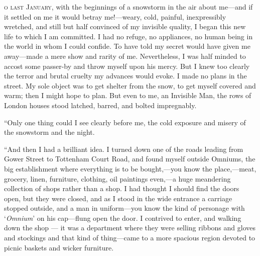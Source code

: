 \label{ch:22}
\begin{ChapterStart}
\vspace*{2\nbs}

\vspace{1.5\nbs}
\end{ChapterStart}

\kern-5pt\textsc{o last January,} with the beginnings of a snowstorm in the air about me—and if it settled on me it would betray me!—weary, cold, painful, inexpressibly wretched, and still but half convinced of my invisible quality, I began this new life to which I am committed. I had no refuge, no appliances, no human being in the world in whom I could confide. To have told my secret would have given me away—made a mere show and rarity of me. Nevertheless, I was half minded to accost some passer-by and throw myself upon his mercy. But I knew too clearly the terror and brutal cruelty my advances would evoke. I made no plans in the street. My sole object was to get shelter from the snow, to get myself covered and warm; then I might hope to plan. But even to me, an Invisible Man, the rows of London houses stood latched, barred, and bolted impregnably.

“Only one thing could I see clearly before me, the cold exposure and misery of the snowstorm and the night.

“And then I had a brilliant idea. I turned down one of the roads leading from Gower Street to Tottenham Court Road, and found myself outside Omniums, the big establishment where everything is to be bought,—you know the place,—meat, grocery, linen, furniture, clothing, oil paintings even,—a huge meandering collection of shops rather than a shop. I had thought I should find the doors open, but they were closed, and as I stood in the wide entrance a carriage stopped outside, and a man in uniform—you know the kind of personage with ‘\emph{Omnium}’ on his cap—flung open the door. I contrived to enter, and walking down the shop — it was a department where they were selling ribbons and gloves and stockings and that kind of thing—came to a more spacious region devoted to picnic baskets and wicker furniture.


